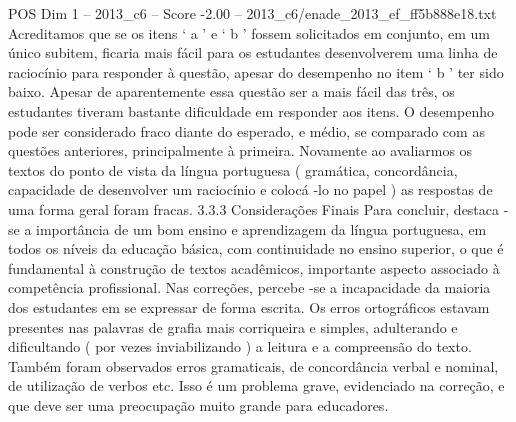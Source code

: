 \begin{textsample}{POS Dim 1 – 2013\_c6 – Score -2.00 – 2013\_c6/enade\_2013\_ef\_ff5b888e18.txt}
Acreditamos que se os itens ‘ a ’ e ‘ b ’ fossem solicitados em conjunto, em um único subitem, ficaria mais fácil para os estudantes desenvolverem uma linha de raciocínio para responder à questão, apesar do desempenho no item ‘ b ’ ter sido baixo.
Apesar de aparentemente essa questão ser a mais fácil das três, os estudantes tiveram bastante dificuldade em responder aos itens.
O desempenho pode ser considerado fraco diante do esperado, e médio, se comparado com as questões anteriores, principalmente à primeira.
Novamente ao avaliarmos os textos do ponto de vista da língua portuguesa ( gramática, concordância, capacidade de desenvolver um raciocínio e colocá -lo no papel ) as respostas de uma forma geral foram fracas. 3.3.3 Considerações Finais Para concluir, destaca -se a importância de um bom ensino e aprendizagem da língua portuguesa, em todos os níveis da educação básica, com continuidade no ensino superior, o que é fundamental à construção de textos acadêmicos, importante aspecto associado à competência profissional.
Nas correções, percebe -se a incapacidade da maioria dos estudantes em se expressar de forma escrita.
Os erros ortográficos estavam presentes nas palavras de grafia mais corriqueira e simples, adulterando e dificultando ( por vezes inviabilizando ) a leitura e a compreensão do texto.
Também foram observados erros gramaticais, de concordância verbal e nominal, de utilização de verbos etc.
Isso é um problema grave, evidenciado na correção, e que deve ser uma preocupação muito grande para educadores.

\end{textsample}
